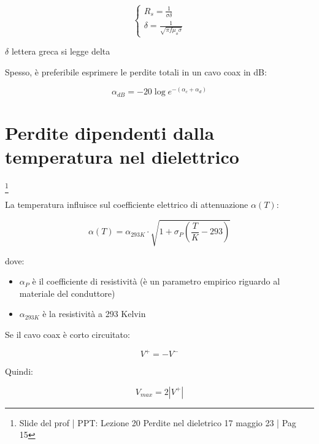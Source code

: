 {\Large \begin{equation}
    \begin{cases}
        R_s = \frac{1}{\sigma \delta} \\ 
        \delta = \frac{1}{\sqrt{\pi f \mu_o \sigma}}
    \end{cases}
\end{equation}}

\begin{tcolorbox}
    $\delta$ lettera greca si legge delta
\end{tcolorbox}

Spesso, è preferibile esprimere le perdite totali in un cavo coax in dB: 

{\Large \begin{equation}
    \alpha_{dB} = -20 \log e^{- (\alpha_c + \alpha_d)}
\end{equation}} 

\newpage 

\section{Perdite dipendenti dalla temperatura nel dielettrico}

\footnote{Slide del prof | PPT: Lezione 20 Perdite nel dieletrico 17 maggio 23 | Pag 15}

La temperatura influisce sul coefficiente elettrico di attenuazione $\alpha(T)$: 

{\Large \begin{equation}
    \alpha (T) = \alpha_{293 K} \cdot \sqrt{1 + \sigma_P (\frac{T}{K} - 293)}
\end{equation}}


dove: 
\begin{itemize}
    \item $\alpha_P$ è il coefficiente di resistività (è un parametro empirico riguardo al materiale del conduttore) 
    \item $\alpha_{293 K}$  è la resistività a 293 Kelvin 
\end{itemize}

Se il cavo coax è corto circuitato: 

{\Large \begin{equation}
    V^{+} = -V^{-}
\end{equation}} 

Quindi: 

{\Large \begin{equation}
    V_{max} = 2 \left|V^{+}\right|
\end{equation}}

\newpage 
